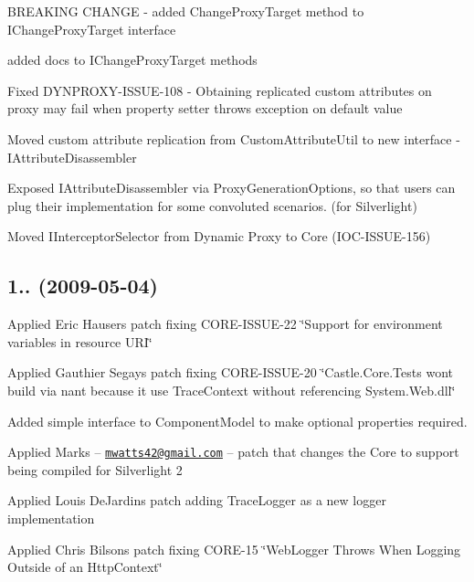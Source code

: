 \begin{DoxyItemize}
\item B\+R\+E\+A\+K\+I\+NG C\+H\+A\+N\+GE -\/ added Change\+Proxy\+Target method to I\+Change\+Proxy\+Target interface
\item added docs to I\+Change\+Proxy\+Target methods
\item Fixed D\+Y\+N\+P\+R\+O\+X\+Y-\/\+I\+S\+S\+U\+E-\/108 -\/ Obtaining replicated custom attributes on proxy may fail when property setter throws exception on default value
\item Moved custom attribute replication from Custom\+Attribute\+Util to new interface -\/ I\+Attribute\+Disassembler
\item Exposed I\+Attribute\+Disassembler via Proxy\+Generation\+Options, so that users can plug their implementation for some convoluted scenarios. (for Silverlight)
\item Moved I\+Interceptor\+Selector from Dynamic Proxy to Core (I\+O\+C-\/\+I\+S\+S\+U\+E-\/156)
\end{DoxyItemize}

\subsection*{1.. (2009-\/05-\/04)}


\begin{DoxyItemize}
\item Applied Eric Hauser\textquotesingle{}s patch fixing C\+O\+R\+E-\/\+I\+S\+S\+U\+E-\/22 \char`\"{}\+Support for environment variables in resource U\+R\+I\char`\"{}
\item Applied Gauthier Segay\textquotesingle{}s patch fixing C\+O\+R\+E-\/\+I\+S\+S\+U\+E-\/20 \char`\"{}\+Castle.\+Core.\+Tests won\textquotesingle{}t build via nant because it use Trace\+Context without referencing System.\+Web.\+dll\char`\"{}
\item Added simple interface to Component\+Model to make optional properties required.
\item Applied Mark\textquotesingle{}s -- \href{mailto:mwatts42@gmail.com}{\tt mwatts42@gmail.\+com} -- patch that changes the Core to support being compiled for Silverlight 2
\item Applied Louis De\+Jardin\textquotesingle{}s patch adding Trace\+Logger as a new logger implementation
\item Applied Chris Bilson\textquotesingle{}s patch fixing C\+O\+R\+E-\/15 \char`\"{}\+Web\+Logger Throws When Logging Outside of an Http\+Context\char`\"{}
\end{DoxyItemize}

